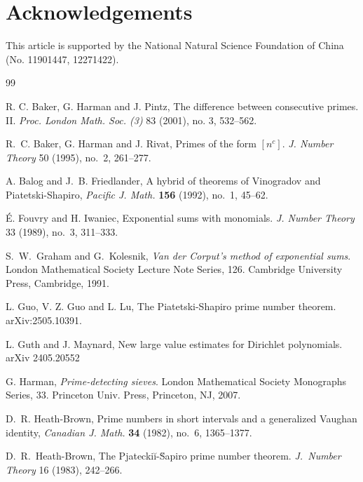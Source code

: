 \documentclass[12pt, reqno, twoside, letterpaper]{amsart}
\numberwithin{equation}{section}
\theoremstyle{customthm}
\theoremstyle{customrem}
\begin{document}
\section*{Acknowledgements}	
This article is supported by the National Natural Science Foundation of China (No. 11901447, 12271422).
	
	
	
	
	
	
	
	
	
	
	
	
	
	
	\begin{thebibliography}{99}
		
		R. C. Baker, G. Harman and J. Pintz,
		The difference between consecutive primes. II.
		\emph{Proc. London Math. Soc. (3)} 83 (2001), no. 3, 532--562.
		
		R.~C. Baker, G. Harman and J. Rivat, 
		Primes of the form $[n^c]$. 
		\emph{J. Number Theory} 50 (1995), no.~2, 261--277.
		
		A. Balog and J.~B. Friedlander, 
		A hybrid of theorems of Vinogradov and Piatetski-Shapiro, 
		\emph{Pacific J. Math.} {\bf 156} (1992), no.~1, 45--62.
		
		\'E. Fouvry and H. Iwaniec,
		Exponential sums with monomials. 
		\emph{J. Number Theory} 33 (1989), no.~3, 311--333.
		

		S.~W.~Graham and G.~Kolesnik,
		\emph{Van der Corput's method of exponential sums}.
		London Mathematical Society Lecture Note Series, 126.
		Cambridge University Press, Cambridge, 1991.
		
		L. Guo, V. Z. Guo and L. Lu,
		The Piatetski-Shapiro prime number theorem.
		arXiv:2505.10391.
		
		L. Guth and J. Maynard,
		New large value estimates for Dirichlet polynomials.
		arXiv 2405.20552
		
		G. Harman, 
		\emph{Prime-detecting sieves}.
		London Mathematical Society Monographs Series, 33. 
		Princeton Univ. Press, Princeton, NJ, 2007.
		
		D.~R. Heath-Brown, Prime numbers in short intervals and a generalized Vaughan identity,
		\emph{Canadian J. Math.} {\bf 34} (1982), no.~6, 1365--1377.
		
		D.~R.~Heath-Brown,
		The Pjatecki\u{i}-\u{S}apiro prime number theorem. 
		\emph{J.\ Number Theory} 16 (1983), 242--266.
		

\end{thebibliography}
\end{document}
